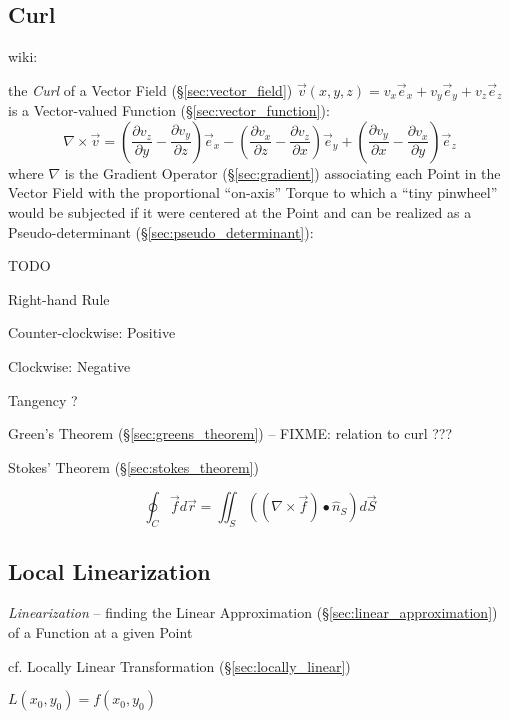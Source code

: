 \subsection{Curl}\label{sec:curl}

wiki:

the \emph{Curl} of a Vector Field (\S\ref{sec:vector_field}) $\vec{v}(x,y,z) =
v_x\vec{e}_x + v_y\vec{e}_y + v_z\vec{e}_z$ is a Vector-valued Function
(\S\ref{sec:vector_function}):
\[
  \nabla\times\vec{v} =
    (\frac{\partial v_z}{\partial y}-\frac{\partial v_y}{\partial z})\vec{e}_x -
    (\frac{\partial v_x}{\partial z}-\frac{\partial v_z}{\partial x})\vec{e}_y +
    (\frac{\partial v_y}{\partial x}-\frac{\partial v_x}{\partial y})\vec{e}_z
\]
where $\nabla$ is the Gradient Operator (\S\ref{sec:gradient}) associating each
Point in the Vector Field with the proportional ``on-axis'' Torque to which a
``tiny pinwheel'' would be subjected if it were centered at the Point and can
be realized as a Pseudo-determinant (\S\ref{sec:pseudo_determinant}):

TODO

Right-hand Rule

Counter-clockwise: Positive

Clockwise: Negative

Tangency ?

Green's Theorem (\S\ref{sec:greens_theorem}) -- FIXME: relation to curl ???

Stokes' Theorem (\S\ref{sec:stokes_theorem})

\[
  \oint_C \vec{f} d\vec{r}
    = \iint_S ((\nabla \times \vec{f}) \bullet \hat{n}_S) d\vec{S}
\]



\subsection{Local Linearization}\label{sec:linearization}

\emph{Linearization} -- finding the Linear Approximation
(\S\ref{sec:linear_approximation}) of a Function at a given Point

\fist cf. Locally Linear Transformation (\S\ref{sec:locally_linear})

$L(x_0,y_0) = f(x_0,y_0)$


